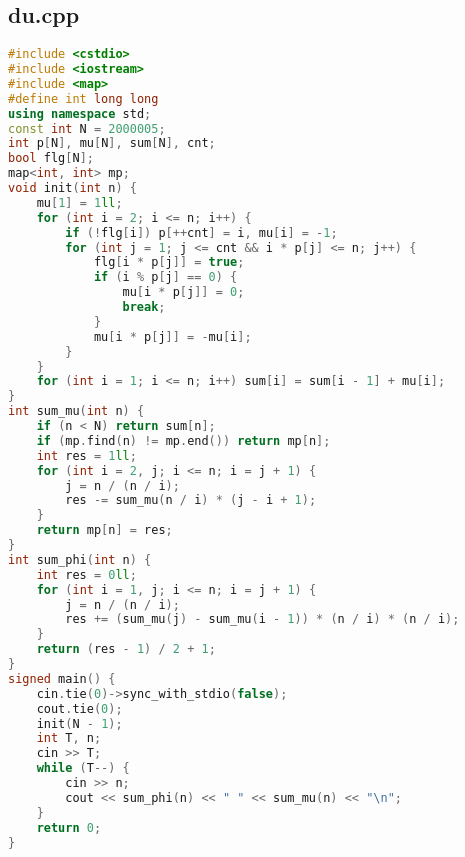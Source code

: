 \documentclass[9pt, a4paper, oneside]{book}
\begin{document}
\subsection{du.cpp}
\begin{lstlisting}[language={C++}]
#include <cstdio>
#include <iostream>
#include <map>
#define int long long
using namespace std;
const int N = 2000005;
int p[N], mu[N], sum[N], cnt;
bool flg[N];
map<int, int> mp;
void init(int n) {
    mu[1] = 1ll;
    for (int i = 2; i <= n; i++) {
        if (!flg[i]) p[++cnt] = i, mu[i] = -1;
        for (int j = 1; j <= cnt && i * p[j] <= n; j++) {
            flg[i * p[j]] = true;
            if (i % p[j] == 0) {
                mu[i * p[j]] = 0;
                break;
            }
            mu[i * p[j]] = -mu[i];
        }
    }
    for (int i = 1; i <= n; i++) sum[i] = sum[i - 1] + mu[i];
}
int sum_mu(int n) {
    if (n < N) return sum[n];
    if (mp.find(n) != mp.end()) return mp[n];
    int res = 1ll;
    for (int i = 2, j; i <= n; i = j + 1) {
        j = n / (n / i);
        res -= sum_mu(n / i) * (j - i + 1);
    }
    return mp[n] = res;
}
int sum_phi(int n) {
    int res = 0ll;
    for (int i = 1, j; i <= n; i = j + 1) {
        j = n / (n / i);
        res += (sum_mu(j) - sum_mu(i - 1)) * (n / i) * (n / i);
    }
    return (res - 1) / 2 + 1;
}
signed main() {
    cin.tie(0)->sync_with_stdio(false);
    cout.tie(0);
    init(N - 1);
    int T, n;
    cin >> T;
    while (T--) {
        cin >> n;
        cout << sum_phi(n) << " " << sum_mu(n) << "\n";
    }
    return 0;
}\end{lstlisting}
\end{document}
